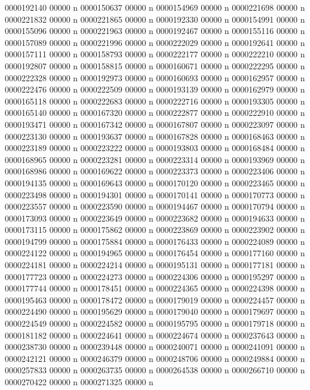 {{{{{{{0000192140 00000 n 
0000150637 00000 n 
0000154969 00000 n 
0000221698 00000 n 
0000221832 00000 n 
0000221865 00000 n 
0000192330 00000 n 
0000154991 00000 n 
0000155096 00000 n 
0000221963 00000 n 
0000192467 00000 n 
0000155116 00000 n 
0000157089 00000 n 
0000221996 00000 n 
0000222029 00000 n 
0000192641 00000 n 
0000157111 00000 n 
0000158793 00000 n 
0000222177 00000 n 
0000222210 00000 n 
0000192807 00000 n 
0000158815 00000 n 
0000160671 00000 n 
0000222295 00000 n 
0000222328 00000 n 
0000192973 00000 n 
0000160693 00000 n 
0000162957 00000 n 
0000222476 00000 n 
0000222509 00000 n 
0000193139 00000 n 
0000162979 00000 n 
0000165118 00000 n 
0000222683 00000 n 
0000222716 00000 n 
0000193305 00000 n 
0000165140 00000 n 
0000167320 00000 n 
0000222877 00000 n 
0000222910 00000 n 
0000193471 00000 n 
0000167342 00000 n 
0000167807 00000 n 
0000223097 00000 n 
0000223130 00000 n 
0000193637 00000 n 
0000167828 00000 n 
0000168463 00000 n 
0000223189 00000 n 
0000223222 00000 n 
0000193803 00000 n 
0000168484 00000 n 
0000168965 00000 n 
0000223281 00000 n 
0000223314 00000 n 
0000193969 00000 n 
0000168986 00000 n 
0000169622 00000 n 
0000223373 00000 n 
0000223406 00000 n 
0000194135 00000 n 
0000169643 00000 n 
0000170120 00000 n 
0000223465 00000 n 
0000223498 00000 n 
0000194301 00000 n 
0000170141 00000 n 
0000170773 00000 n 
0000223557 00000 n 
0000223590 00000 n 
0000194467 00000 n 
0000170794 00000 n 
0000173093 00000 n 
0000223649 00000 n 
0000223682 00000 n 
0000194633 00000 n 
0000173115 00000 n 
0000175862 00000 n 
0000223869 00000 n 
0000223902 00000 n 
0000194799 00000 n 
0000175884 00000 n 
0000176433 00000 n 
0000224089 00000 n 
0000224122 00000 n 
0000194965 00000 n 
0000176454 00000 n 
0000177160 00000 n 
0000224181 00000 n 
0000224214 00000 n 
0000195131 00000 n 
0000177181 00000 n 
0000177723 00000 n 
0000224273 00000 n 
0000224306 00000 n 
0000195297 00000 n 
0000177744 00000 n 
0000178451 00000 n 
0000224365 00000 n 
0000224398 00000 n 
0000195463 00000 n 
0000178472 00000 n 
0000179019 00000 n 
0000224457 00000 n 
0000224490 00000 n 
0000195629 00000 n 
0000179040 00000 n 
0000179697 00000 n 
0000224549 00000 n 
0000224582 00000 n 
0000195795 00000 n 
0000179718 00000 n 
0000181182 00000 n 
0000224641 00000 n 
0000224674 00000 n 
0000237643 00000 n 
0000238730 00000 n 
0000239448 00000 n 
0000240071 00000 n 
0000241091 00000 n 
0000242121 00000 n 
0000246379 00000 n 
0000248706 00000 n 
0000249884 00000 n 
0000257833 00000 n 
0000263735 00000 n 
0000264538 00000 n 
0000266710 00000 n 
0000270422 00000 n 
0000271325 00000 n 
}}}}}}}
